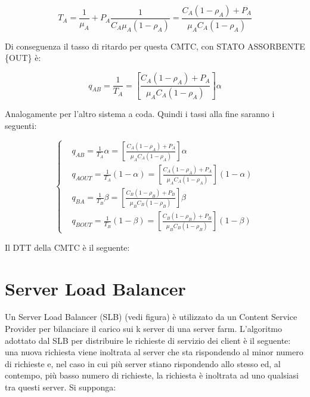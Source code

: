 \[
	T_A = \frac{1}{\mu_A} + P_A \frac{1}{C_A\mu_A(1-\rho_A)} = \frac{C_A(1-\rho_A)+P_A}{\mu_A C_A(1-\rho_A)}
\]

Di conseguenza il tasso di ritardo per questa CMTC, con STATO ASSORBENTE \{OUT\} è:

\[
	q_{AB} = \frac{1}{T_A} = [\frac{C_A(1-\rho_A)+P_A}{\mu_A C_A(1-\rho_A)}]\alpha
\]

Analogamente per l'altro sistema a coda. Quindi i tassi alla fine saranno i seguenti:

\[
	\left\{
	\begin{aligned}
	&q_{AB} = \frac{1}{T_A}\alpha = [\frac{C_A(1-\rho_A)+P_A}{\mu_A C_A(1-\rho_A)}]\alpha\\
	&q_{AOUT} = \frac{1}{T_A}(1-\alpha) = [\frac{C_A(1-\rho_A)+P_A}{\mu_A C_A(1-\rho_A)}](1-\alpha)\\
	&q_{BA} = \frac{1}{T_B}\beta = [\frac{C_B(1-\rho_B)+P_B}{\mu_B C_B(1-\rho_B)}]\beta\\
	&q_{BOUT} = \frac{1}{T_B}(1-\beta) = [\frac{C_B(1-\rho_B)+P_B}{\mu_B C_B(1-\rho_B)}](1-\beta)
	\end{aligned}
	\right.
\]

Il DTT della CMTC è il seguente:

\begin{center}
\end{center}


\section{Server Load Balancer}

Un Server Load Balancer (SLB) (vedi figura) è utilizzato da un Content Service 
Provider per bilanciare il carico sui k server di una server farm. L’algoritmo 
adottato dal SLB per distribuire le richieste di servizio dei client è il 
seguente: una nuova richiesta viene inoltrata al server che sta rispondendo al 
minor numero di richieste e, nel caso in cui più server stiano rispondendo allo 
stesso ed, al contempo, più basso numero di richieste, la richiesta è inoltrata 
ad uno qualsiasi tra questi server. 
Si supponga: 


